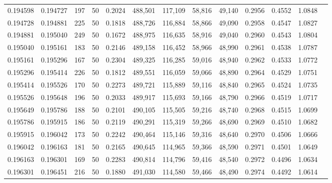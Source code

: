 \begin{tabular}{rrrrrrrrrrrrr}
0.194598 & 0.194727 &   197 &  50 &                                     0.2024 & 488,501 & 117,109 &  58,816 &  49,140 & 0.2956 & 0.4552 & 1.0848 \\
0.194728 & 0.194881 &   225 &  50 &                                     0.1818 & 488,726 & 116,884 &  58,866 &  49,090 & 0.2958 & 0.4547 & 1.0827 \\
0.194881 & 0.195040 &   249 &  50 &                                     0.1672 & 488,975 & 116,635 &  58,916 &  49,040 & 0.2960 & 0.4543 & 1.0804 \\
0.195040 & 0.195161 &   183 &  50 &                                     0.2146 & 489,158 & 116,452 &  58,966 &  48,990 & 0.2961 & 0.4538 & 1.0787 \\
0.195161 & 0.195296 &   167 &  50 &                                     0.2304 & 489,325 & 116,285 &  59,016 &  48,940 & 0.2962 & 0.4533 & 1.0772 \\
0.195296 & 0.195414 &   226 &  50 &                                     0.1812 & 489,551 & 116,059 &  59,066 &  48,890 & 0.2964 & 0.4529 & 1.0751 \\
0.195414 & 0.195526 &   170 &  50 &                                     0.2273 & 489,721 & 115,889 &  59,116 &  48,840 & 0.2965 & 0.4524 & 1.0735 \\
0.195526 & 0.195648 &   196 &  50 &                                     0.2033 & 489,917 & 115,693 &  59,166 &  48,790 & 0.2966 & 0.4519 & 1.0717 \\
0.195649 & 0.195786 &   188 &  50 &                                     0.2101 & 490,105 & 115,505 &  59,216 &  48,740 & 0.2968 & 0.4515 & 1.0699 \\
0.195786 & 0.195915 &   186 &  50 &                                     0.2119 & 490,291 & 115,319 &  59,266 &  48,690 & 0.2969 & 0.4510 & 1.0682 \\
0.195915 & 0.196042 &   173 &  50 &                                     0.2242 & 490,464 & 115,146 &  59,316 &  48,640 & 0.2970 & 0.4506 & 1.0666 \\
0.196042 & 0.196163 &   181 &  50 &                                     0.2165 & 490,645 & 114,965 &  59,366 &  48,590 & 0.2971 & 0.4501 & 1.0649 \\
0.196163 & 0.196301 &   169 &  50 &                                     0.2283 & 490,814 & 114,796 &  59,416 &  48,540 & 0.2972 & 0.4496 & 1.0634 \\
0.196301 & 0.196451 &   216 &  50 &                                     0.1880 & 491,030 & 114,580 &  59,466 &  48,490 & 0.2974 & 0.4492 & 1.0614 \\

\end{tabular}
